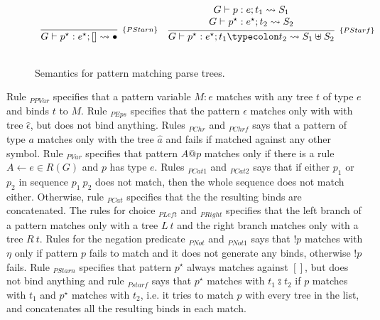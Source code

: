 \begin{figure}[H]
\[\begin{array}{cc}
      \infer[_{\{PStarn\}}]{G \vdash p^\star : e^\star ; [] \leadsto \bullet}{} &
      \infer[_{\{PStarf\}}]{G\vdash p^\star : e^\star ; t_1  \typecolon  t_2 \leadsto S_1 \uplus S_2}
                        {\begin{array}{c}
                           G \vdash p : e ; t_1 \leadsto S_1\\
                           G \vdash p^\star : e^\star ; t_2 \leadsto S_2
                         \end{array}}\\ \\
    \end{array}
  \]
  \centering
  \caption{Semantics for pattern matching parse trees.}
  \label{fig:pattern-semantics}
\end{figure}

Rule \(_{PPVar}\) specifies that a pattern variable \(M : e\) matches with any
tree \(t\) of type \(e\) and binds \(t\) to \(M\). Rule \(_{PEps}\) specifies 
that the pattern \(\epsilon\) matches only with with tree \(\hat{\epsilon}\),
but does not bind anything. Rules \(_{PChr}\) and \(_{PChrf}\) says that 
a pattern of type \(a\) matches only with the tree \(\hat{a}\) and fails if 
matched against any other symbol. Rule \(_{PVar}\) specifies that pattern \(A@p\)
matches only if there is a rule \(A \leftarrow e \in R(G)\) and \(p\) has type \(e\).
Rules \(_{PCat1}\) and \(_{PCat2}\) says that if either \(p_1\) or \(p_2\) in
sequence \(p_1\:p_2\) does not match, then the whole sequence does not match either.
Otherwise, rule \(_{PCat}\) specifies that the the resulting binds are concatenated.
The rules for choice \(_{PLeft}\) and \(_{PRight}\) specifies that the left branch 
of a pattern matches only with a tree \(L\:t\) and the right branch matches only
with a tree \(R\:t\). Rules for the negation predicate \(_{PNot}\) and \(_{PNot1}\)
says that \(!p\) matches with \(\eta\) only if pattern \(p\) fails to match 
and it does not generate any binds, otherwise \(!p\) fails.
Rule \(_{PStarn}\) specifies that pattern \(p^\star\) always matches against \([]\),
but does not bind anything and rule \(_{Pstarf}\) says that \(p^\star\) matches 
with \(t_1 \typecolon t_2\) if \(p\) matches with \(t_1\) and \(p^\star\) matches 
with \(t_2\), i.e. it tries to match \(p\) with every tree in the list, and 
concatenates all the resulting binds in each match.

